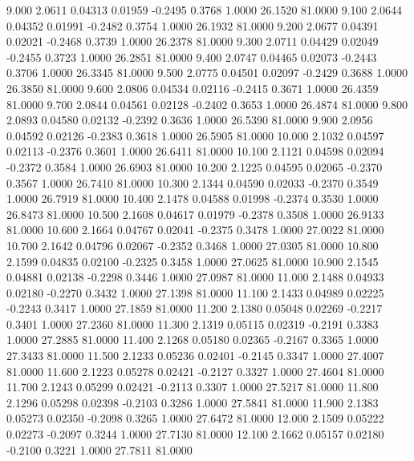    9.000   2.0611   0.04313   0.01959  -0.2495   0.3768   1.0000  26.1520  81.0000
   9.100   2.0644   0.04352   0.01991  -0.2482   0.3754   1.0000  26.1932  81.0000
   9.200   2.0677   0.04391   0.02021  -0.2468   0.3739   1.0000  26.2378  81.0000
   9.300   2.0711   0.04429   0.02049  -0.2455   0.3723   1.0000  26.2851  81.0000
   9.400   2.0747   0.04465   0.02073  -0.2443   0.3706   1.0000  26.3345  81.0000
   9.500   2.0775   0.04501   0.02097  -0.2429   0.3688   1.0000  26.3850  81.0000
   9.600   2.0806   0.04534   0.02116  -0.2415   0.3671   1.0000  26.4359  81.0000
   9.700   2.0844   0.04561   0.02128  -0.2402   0.3653   1.0000  26.4874  81.0000
   9.800   2.0893   0.04580   0.02132  -0.2392   0.3636   1.0000  26.5390  81.0000
   9.900   2.0956   0.04592   0.02126  -0.2383   0.3618   1.0000  26.5905  81.0000
  10.000   2.1032   0.04597   0.02113  -0.2376   0.3601   1.0000  26.6411  81.0000
  10.100   2.1121   0.04598   0.02094  -0.2372   0.3584   1.0000  26.6903  81.0000
  10.200   2.1225   0.04595   0.02065  -0.2370   0.3567   1.0000  26.7410  81.0000
  10.300   2.1344   0.04590   0.02033  -0.2370   0.3549   1.0000  26.7919  81.0000
  10.400   2.1478   0.04588   0.01998  -0.2374   0.3530   1.0000  26.8473  81.0000
  10.500   2.1608   0.04617   0.01979  -0.2378   0.3508   1.0000  26.9133  81.0000
  10.600   2.1664   0.04767   0.02041  -0.2375   0.3478   1.0000  27.0022  81.0000
  10.700   2.1642   0.04796   0.02067  -0.2352   0.3468   1.0000  27.0305  81.0000
  10.800   2.1599   0.04835   0.02100  -0.2325   0.3458   1.0000  27.0625  81.0000
  10.900   2.1545   0.04881   0.02138  -0.2298   0.3446   1.0000  27.0987  81.0000
  11.000   2.1488   0.04933   0.02180  -0.2270   0.3432   1.0000  27.1398  81.0000
  11.100   2.1433   0.04989   0.02225  -0.2243   0.3417   1.0000  27.1859  81.0000
  11.200   2.1380   0.05048   0.02269  -0.2217   0.3401   1.0000  27.2360  81.0000
  11.300   2.1319   0.05115   0.02319  -0.2191   0.3383   1.0000  27.2885  81.0000
  11.400   2.1268   0.05180   0.02365  -0.2167   0.3365   1.0000  27.3433  81.0000
  11.500   2.1233   0.05236   0.02401  -0.2145   0.3347   1.0000  27.4007  81.0000
  11.600   2.1223   0.05278   0.02421  -0.2127   0.3327   1.0000  27.4604  81.0000
  11.700   2.1243   0.05299   0.02421  -0.2113   0.3307   1.0000  27.5217  81.0000
  11.800   2.1296   0.05298   0.02398  -0.2103   0.3286   1.0000  27.5841  81.0000
  11.900   2.1383   0.05273   0.02350  -0.2098   0.3265   1.0000  27.6472  81.0000
  12.000   2.1509   0.05222   0.02273  -0.2097   0.3244   1.0000  27.7130  81.0000
  12.100   2.1662   0.05157   0.02180  -0.2100   0.3221   1.0000  27.7811  81.0000
